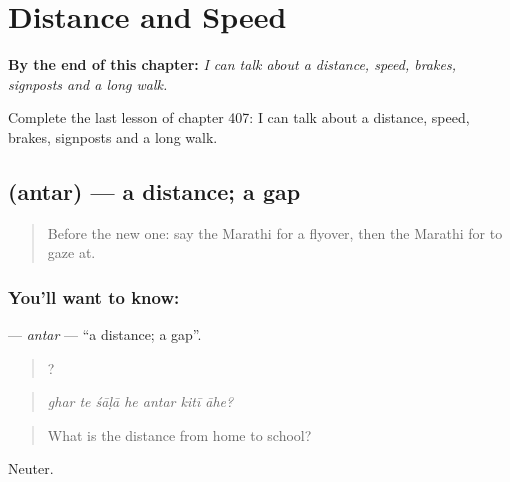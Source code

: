 
\chapter{Distance and Speed}
\label{ch:mr-distance-and-speed}

\begin{chapteropening}
\textbf{By the end of this chapter:} \emph{I can talk about a distance, speed, brakes, signposts and a long walk.}

Complete the last lesson of chapter 407: I can talk about a distance, speed, brakes, signposts and a long walk.
\end{chapteropening}

\section[\texorpdfstring{\mr{अंतर} (antar)}{अंतर (antar)}]{ (antar) — a distance; a gap}

\label{lesson:MR-C407-antar}



\begin{quote}
Before the new one: say the Marathi for a flyover, then the Marathi for to gaze at.
\end{quote}

\subsection*{You'll want to know: }
\textbf{} — \emph{antar} — \textquotedblleft{}a distance; a gap\textquotedblright{}.

\begin{quote}
      ?
\end{quote}

\begin{quote}
\emph{ghar te śāḷā he antar kitī āhe?}
\end{quote}

\begin{quote}
What is the distance from home to school?
\end{quote}

Neuter.

